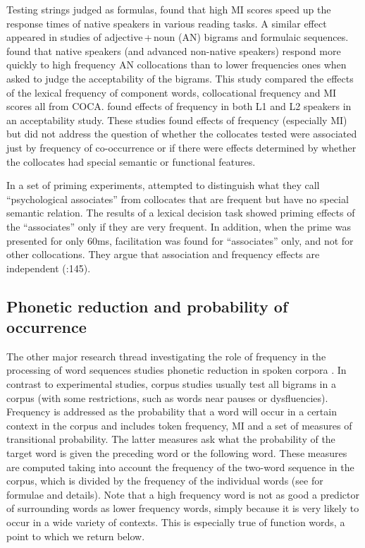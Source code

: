 \documentclass[output=paper]{langscibook}
\begin{document}
Testing strings judged as formulas, \citet{EllisMaynard2008} found that high MI scores speed up the response times of native speakers in various reading tasks. A similar effect appeared in studies of adjective\,+\,noun (AN) bigrams and formulaic sequences. \citet{WolterYamashita2018} found that native speakers (and advanced non-native speakers) respond more quickly to high frequency AN collocations than to lower frequencies ones when asked to judge the acceptability of the bigrams. This study compared the effects of the lexical frequency of component words, collocational frequency and MI scores all from COCA. \citet{ÖksüzBrezinaRebuschat2021} found effects of frequency in both L1 and L2 speakers in an acceptability study. These studies found effects of frequency (especially MI) but did not address the question of whether the collocates tested were associated just by frequency of co-occurrence or if there were effects determined by whether the collocates had special semantic or functional features.

In a set of priming experiments, \citet{DurrantDoherty2010} attempted to distinguish what they call ``psychological associates'' from collocates that are frequent but have no special semantic relation. The results of a lexical decision task showed priming effects of the ``associates'' only if they are very frequent. In addition, when the prime was presented for only 60ms, facilitation was found for ``associates'' only, and not for other collocations. They argue that association and frequency effects are independent (\citealt{DurrantDoherty2010}:145). 

\subsection{ Phonetic reduction and probability of occurrence}\label{sec:bybee:1.3}

The other major research thread investigating the role of frequency in the processing of word sequences studies phonetic reduction in spoken corpora \citep{GregoryEtAl1999,JurafskyEtAl2001,BellJurafsky2009,Seyfarth2014,SóskuthyHay2017}. In contrast to experimental studies, corpus studies usually test all bigrams in a corpus (with some restrictions, such as words near pauses or dysfluencies). Frequency is addressed as the probability that a word will occur in a certain context in the corpus and includes token frequency, MI and a set of measures of transitional probability. The latter measures ask what the probability of the target word is given the preceding word or the following word. These measures are computed taking into account the frequency of the two-word sequence in the corpus, which is divided by the frequency of the individual words (see \citealt{GregoryEtAl1999,JurafskyEtAl2001} for formulae and details). Note that a high frequency word is not as good a predictor of surrounding words as lower frequency words, simply because it is very likely to occur in a wide variety of contexts. This is especially true of function words, a point to which we return below. 
\end{document}

